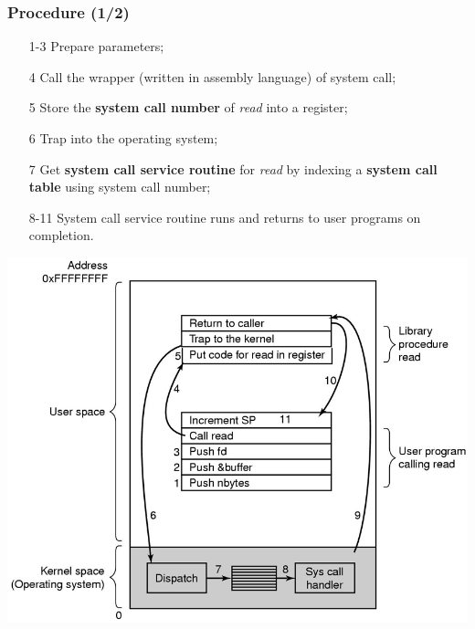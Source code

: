 \documentclass[CJKutf8,xcolor=pdftex,dvipsnames,table]{beamer}
\begin{document}
\begin{CJK*}{UTF8}{song}
  \begin{frame}
    \frametitle{Procedure (1/2)} \pause
    \small
    \begin{minipage}[c]{0.45\textwidth}
      \begin{enumerate}
      \item[1-3]{Prepare parameters;} \pause
      \item[4]{Call the wrapper (written in assembly language) of system call;} \pause
      \item[5]{Store the \textbf{system call number} of \emph{read} into a register;} \pause
      \item[6]{Trap into the operating system;} \pause
      \item[7]{Get \textbf{system call service routine} for \emph{read} by indexing a \textbf{system call table} using system call number;} \pause
      \item[8-11]{System call service routine runs and returns to user programs on completion.} \pause
      \end{enumerate}
    \end{minipage}%
    \begin{minipage}[c]{0.55\textwidth}
      \begin{center}
        \includegraphics[scale=0.45]{mosv2f1-17}
      \end{center}
    \end{minipage}
    \normalsize
  \end{frame}


\end{CJK*}
\end{document}
